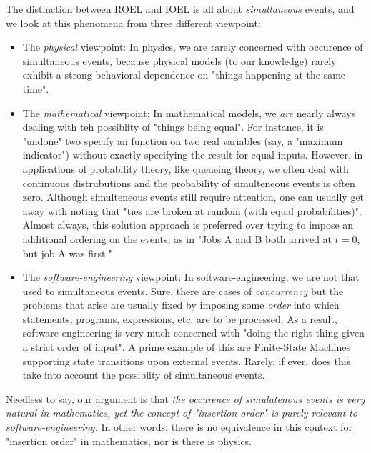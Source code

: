 \documentclass[12pt]{book}
\begin{document}
The distinction between ROEL and IOEL is all about {\em simultaneous\/}
  events, and we look at this phenomena from three different viewpoint:
\begin{itemize}
\item The {\em physical\/} viewpoint: In physics, we are rarely concerned with occurence of
        simultaneous events, because physical models (to our knowledge) rarely
        exhibit a strong behavioral dependence on "things happening at the same time".
\item The {\em mathematical\/} viewpoint: In mathematical models, we {\em are\/}
        nearly always dealing with teh possiblity of "things being equal".
      For instance, it is "undone" two specify an function on two real variables
        (say, a "maximum indicator") without exactly specifying the result
        for equal inputs.
      However, in applications of probability theory, like queueing theory,
        we often deal with continuous distrubutions and
        the probability of simulteneous events is often zero.
      Although simulteneous events still require attention,
        one can usually get away with noting that
        "ties are broken at random (with equal probabilities)".
      Almost always, this solution approach is preferred over trying
        to impose an additional ordering on the events, as in
        "Jobs A and B both arrived at $t=0$, but job A was first."
\item The {\em software-engineering\/} viewpoint: In software-engineering,
        we are not that used to simultaneous events.
      Sure, there are cases of {\em concurrency\/}
        but the problems that arise are usually fixed by
        imposing some {\em order\/} into which statements,
        programs, expressions, etc. are to be processed.
      As a result, software engineering is very much concerned with
        "doing the right thing given a strict order of input".
      A prime example of this are Finite-State Machines supporting
        state transitions upon external events.
      Rarely, if ever, does this take into account the possiblity
        of simultaneous events.
\end{itemize}
Needless to say, our argument is that {\em the occurence of simulatenous events
  is very natural in mathematics, yet the concept of "insertion order"
  is purely relevant to software-engineering.}
In other words, there is no equivalence in this context for "insertion order"
  in mathematics, nor is there is physics.
\end{document}
